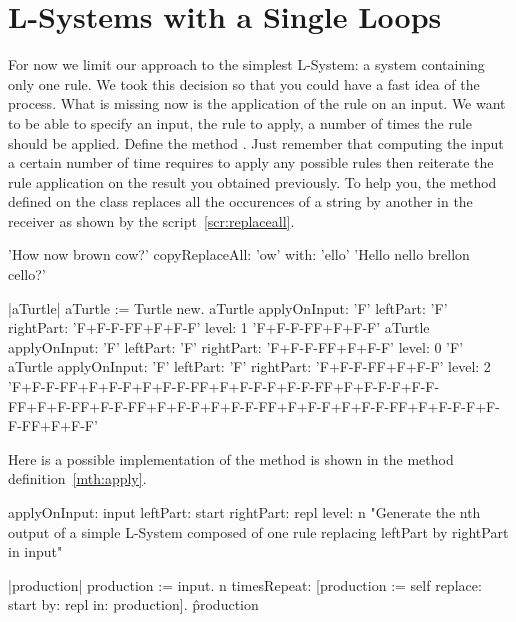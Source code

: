 \section{L-Systems with a Single Loops}
For now we limit our approach to the simplest L-System: a system
containing only one rule. We took this decision so that you
could have a fast idea of the process. What is missing now is the application of the rule on an input. We want to be able to specify an input, the rule to apply, a number of times the rule should be applied.  Define the
method .  Just remember that computing the input a certain number of time requires to apply any possible rules then reiterate the rule application on the result you obtained previously.
To help you, the method  defined on
the class  replaces all the occurences of a string by another in the receiver as shown by the script~\ref{scr:replaceall}.


\begin{scriptwithouttitle}\label{scr:replaceall}
'How now brown cow?' copyReplaceAll: 'ow' with: 'ello'
\pr 'Hello nello brellon cello?'
\end{scriptwithouttitle}

\begin{scriptwithouttitle}
|aTurtle|
aTurtle := Turtle new.
aTurtle applyOnInput: 'F' leftPart: 'F' rightPart: 'F+F-F-FF+F+F-F' level: 1
\pr'F+F-F-FF+F+F-F'
aTurtle applyOnInput: 'F' leftPart: 'F' rightPart: 'F+F-F-FF+F+F-F' level: 0
\pr 'F'
aTurtle applyOnInput: 'F' leftPart: 'F' rightPart: 'F+F-F-FF+F+F-F' level: 2
\pr 'F+F-F-FF+F+F-F+F+F-F-FF+F+F-F-F+F-F-FF+F+F-F-F+F-F-\\ FF+F+F-FF+F-F-FF+F+F-F+F+F-F-FF+F+F-F+F+F-F-FF+F+F-F-F+F-F-FF+F+F-F'
\end{scriptwithouttitle}

Here is a possible implementation of the method  is shown in the method definition~\ref{mth:apply}.

\begin{method}\label{mth:apply}
applyOnInput: input leftPart: start rightPart: repl level: n
   "Generate the nth output of a simple L-System composed of one rule
   replacing leftPart by rightPart in input"
       
   |production|
   production := input.
   n timesRepeat: [production := self 
                                   replace: start
                                   by: repl 
                                   in: production].
   \^ production
\end{method}

